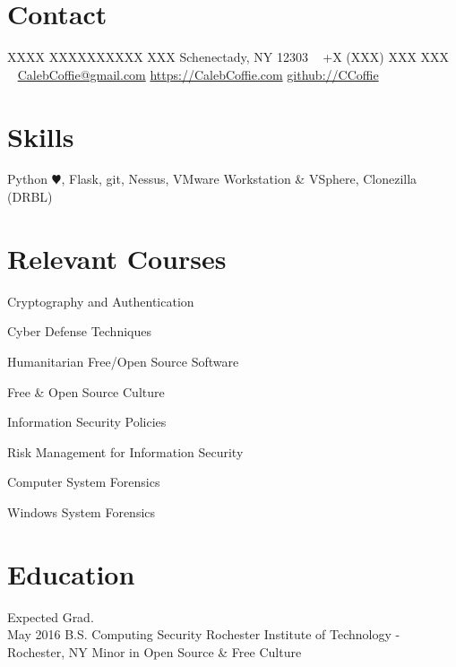 \documentclass[]{CalebCoffie-CV-Class} %
\begin{document}


\begin{aside} %
\section{Contact}
XXXX XXXXXXXXXX XXX
Schenectady, NY 12303
~
+X (XXX) XXX XXX
~
\href{mailto:CalebCoffie@gmail.com}{CalebCoffie@gmail.com}
\href{https://CalebCoffie.com}{https://CalebCoffie.com}
\href{https://github.com/johnsmith}{github://CCoffie}
\section{Skills}
Python {\color{black} $\varheartsuit$}, Flask, git, Nessus, VMware Workstation \& VSphere, Clonezilla (DRBL)
\section{Relevant Courses}
\item Cryptography and Authentication
\item Cyber Defense Techniques
\item Humanitarian Free/Open Source Software
\item Free \& Open Source Culture
\item Information Security Policies
\item Risk Management for Information Security
\item Computer System Forensics
\item Windows System Forensics
\end{aside}


\section{Education}

\begin{entrylist}
\entry
{Expected Grad.\\May 2016}
{B.S. {\normalfont Computing Security}}
{Rochester Institute of Technology - Rochester, NY}
{Minor in Open Source \& Free Culture}
\end{entrylist}
\end{document}
